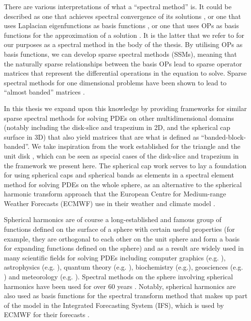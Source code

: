 There are various interpretations of what a \enquote{spectral method} is. It could be described as one that achieves spectral convergence of its solutions \cite{gottlieb1977numerical}, or one that uses Laplacian eigenfunctions as basis functions \cite{zhong2007numerical}, or one that uses OPs as basis functions for the approximation of a solution \cite{olver2019triangle}. It is the latter that we refer to for our purposes as a spectral method in the body of the thesis. By utilising OPs as basis functions, we can develop sparse spectral methods (SSMs), meaning that the naturally sparse relationships between the basis OPs lead to sparse operator matrices that represent the differential operations in the equation to solve. Sparse spectral methods for one dimensional problems have been shown to lead to \enquote{almost banded} matrices \cite{olver2013fast}.

In this thesis we expand upon this knowledge by providing frameworks for similar sparse spectral methods for solving PDEs on other multidimensional domains (notably including the disk-slice and trapezium in 2D, and the spherical cap surface in 3D) that also yield matrices that are what is defined as \enquote{banded-block-banded}. We take inspiration from the work established for the triangle \cite{olver2019triangle} and the unit disk \cite{vasil2016tensor}, which can  be seen as special cases of the disk-slice and trapezium in the framework we present here. The spherical cap work serves to lay a foundation for using spherical caps and spherical bands as elements in a spectral element method for solving PDEs on the whole sphere, as an alternative to the spherical harmonic transform approach that the European Centre for Medium-range Weather Forecasts (ECMWF) use in their weather and climate model \cite{cheong2006dynamical}. 

Spherical harmonics are of course a long-established and famous group of functions defined on the surface of a sphere with certain useful properties (for example, they are orthogonal to each other on the unit sphere and form a basis for expanding functions defined on the sphere) and as a result are widely used in many scientific fields for solving PDEs including computer graphics (e.g. \cite{moon2008efficient, sloan2013efficient}), astrophysics (e.g. \cite{vasil2019tensor}), quantum theory (e.g. \cite{varshalovich1988quantum}), biochemistry (e.g.\cite{parimal2014application, basko1998application}), geosciences (e.g. \cite{fletcher2017data, hollerbach2013parity}) and meteorology (e.g. \cite{evans1998spherical, rubinstein2015scalar, wedi2013fast, ecmwf2020scalability, courtier1998ecmwf, silberman1954planetary, gottlieb1977numerical}). Spectral methods on the sphere involving spherical harmonics have been used for over 60 years \cite{silberman1954planetary}. Notably, spherical harmonics are also used as basis functions for the spectral transform method that makes up part of the model in the Integrated Forecasting System (IFS), which is used by ECMWF for their forecasts \cite{wedi2013fast}. 

